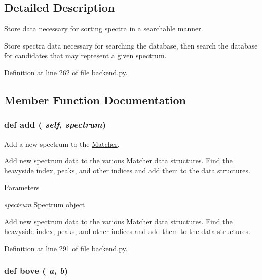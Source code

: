 \subsection{Detailed Description}
Store data necessary for sorting spectra in a searchable manner. \begin{DoxyVerb}Store spectra data necessary for searching the database, then search the database
for candidates that may represent a given spectrum.\end{DoxyVerb}
 

Definition at line 262 of file backend.py.



\subsection{Member Function Documentation}
\hypertarget{classbackend_1_1_matcher_a66aa7c8063db6217a0a0061f8b7ba206}{
\subsubsection[{add}]{\setlength{\rightskip}{0pt plus 5cm}def add ( {\em self}, \/   {\em spectrum})}}
\label{classbackend_1_1_matcher_a66aa7c8063db6217a0a0061f8b7ba206}


Add a new spectrum to the \hyperlink{classbackend_1_1_matcher}{Matcher}. 

Add new spectrum data to the various \hyperlink{classbackend_1_1_matcher}{Matcher} data structures. Find the heavyside index, peaks, and other indices and add them to the data structures.


\begin{DoxyParams}{Parameters}
\item[{\em spectrum}]\hyperlink{classbackend_1_1_spectrum}{Spectrum} object\begin{DoxyVerb}Add new spectrum data to the various Matcher data structures. Find the heavyside
index, peaks, and other indices and add them to the data structures.\end{DoxyVerb}
 \end{DoxyParams}


Definition at line 291 of file backend.py.

\hypertarget{classbackend_1_1_matcher_a989553190033eaa893e27d2907fce91e}{
\subsubsection[{bove}]{\setlength{\rightskip}{0pt plus 5cm}def bove ( {\em a}, \/   {\em b})}}
\label{classbackend_1_1_matcher_a989553190033eaa893e27d2907fce91e}



